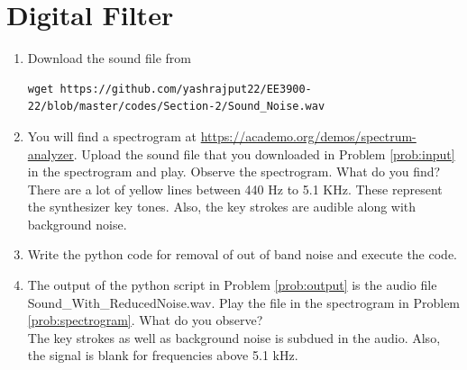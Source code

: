 \documentclass[journal,12pt,twocolumn]{IEEEtran}
\renewcommand\thesection{\arabic{section}}
\begin{document}
\section{Digital Filter}
\begin{enumerate}[label=\thesection.\arabic*
,ref=\thesection.\theenumi]
\item
\label{prob:input}
Download the sound file from  
\begin{lstlisting}
wget https://github.com/yashrajput22/EE3900-22/blob/master/codes/Section-2/Sound_Noise.wav
\end{lstlisting}
\item
\label{prob:spectrogram}
You will find a spectrogram at \href{https://academo.org/demos/spectrum-analyzer}{\url{https://academo.org/demos/spectrum-analyzer}}. 
%
Upload the sound file that you downloaded in Problem \ref{prob:input} in the spectrogram  and play.  Observe the spectrogram. What do you find?
\\
%
\solution There are a lot of yellow lines between 440 Hz to 5.1 KHz.  These represent the synthesizer key tones. Also, the key strokes
are audible along with background noise.
\item
\label{prob:output}
Write the python code for removal of out of band noise and execute the code.
\\
\solution

\item
The output of the python script in Problem \ref{prob:output} is the audio file Sound\_With\_ReducedNoise.wav. Play the file in the spectrogram in Problem \ref{prob:spectrogram}. What do you observe?
\\
\solution The key strokes as well as background noise is subdued in the audio.  Also,  the signal is blank for frequencies above 5.1 kHz.
\end{enumerate}
\end{document}

